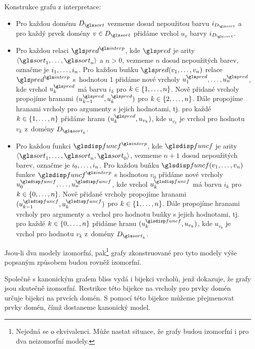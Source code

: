 Konstrukce grafu z interpretace:
\begin{itemize}
\item Pro každou doménu $D_\sort$ vezmeme dosud nepoužitou barvu $i_{D_\sort}$
  a pro každý prvek domény $v \in D_\sort$ přidáme vrchol $u_v$ barvy
  $i_{D_\sort}$.
\item Pro každou relaci $\pred^\interp$, kde $\pred$ je arity
  $\langle \sort_1 \comdots \sort_n \rangle$ a $n > 0$,
  vezmeme $n$ dosud nepoužitých barev, označme je
  $i_1 , \ldots, i_n$.
  Pro každou buňku $\pred(v_1 \comdots v_n)$ relace $\pred^\interp$
  s~hodnotou 1 přidáme nové vrcholy $u_1^\pred \comdots u_n^\pred$,
  kde vrchol $u_k^\pred$ má barvu $i_k$ pro $k \in \{ 1 , \ldots, n \}$.
  Nově přidané vrcholy propojíme hranami $(u_{k-1}^\pred, u_k^\pred)$ pro
  $k \in \{ 2 , \ldots, n \}$. Dále propojíme hranami
  vrcholy pro argumenty s jejich hodnotami, tj. pro
  každé $k \in \{ 1 , \ldots, n \}$ přidáme hranu
  $(u_k^\pred, u_{v_k})$, kde $u_{v_k}$ je vrchol pro hodnotu
  $v_k$ z~domény $D_{\sort_k}$.
\item Pro každou funkci $\func^\interp$, kde $\func$ je arity
  $\langle \sort_1 \comdots \sort_n, \sort_0 \rangle$,
  vezmeme $n + 1$ dosud ne\-pou\-ži\-tých barev, označme je
  $i_0 , \ldots, i_n$.
  Pro každou buňku $\func(v_1 \comdots v_n)$ funkce $\func^\interp$
  s hodnotou $v_0$ přidáme nové vrcholy $u_0^\func \comdots u_n^\func$,
  kde vrchol $u_k^\func$ má barvu $i_k$ pro $k \in \{ 0 , \ldots, n \}$.
  Nově přidané vrcholy propojíme hranami $(u_{k-1}^\func, u_k^\func)$ pro
  $k \in \{ 1 , \ldots, n \}$. Dále propojíme hranami
  vrcholy pro argumenty a vrchol pro hodnotu buňky s jejich hodnotami, tj. pro
  každé $k \in \{ 0 , \ldots, n \}$ přidáme hranu
  $(u_k^\func, u_{v_k})$, kde $u_{v_k}$ je vrchol pro hodnotu
  $v_k$ z~domény $D_{\sort_k}$.
\end{itemize}
Jsou-li dva modely izomorfní, pak\footnote{Nejedná se o ekvivalenci.
Může nastat situace, že grafy budou izomorfní i pro dva neizomorfní modely.}
grafy zkonstruované pro tyto modely výše popsaným způsobem budou
rovněž izomorfní.

%

Společně s kanonickým grafem bliss vydá i bijekci vrcholů,
jenž dokazuje, že grafy jsou skutečně izomorfní.
Restrikce této bijekce na vrcholy pro prvky domén
určuje bijekci na prvcích domén.
S pomocí této bijekce můžeme přejmenovat prvky
domén, čímž dostaneme kanonický model.

